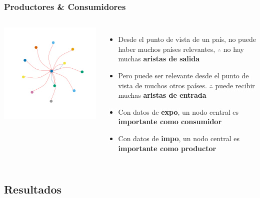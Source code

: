 \documentclass[compress]{beamer}
\begin{document}
\begin{frame}
\frametitle{Productores \& Consumidores}	
\begin{columns}
\includegraphics[width=\linewidth]{toy_graph1}

\begin{itemize}[label=\faRebel]
	\item Desde el punto de vista de un país, no puede haber muchos países relevantes, $\therefore$ no hay muchas \textbf{aristas de salida}
	\item Pero puede ser relevante desde el punto de vista de muchos otros países.
	$\therefore$ puede recibir muchas \textbf{aristas de entrada}
	\item Con datos de \textbf{expo}, un nodo central es \textbf{importante como consumidor}
	\item Con datos de \textbf{impo}, un nodo central es \textbf{importante como productor}
\end{itemize}	
\end{columns}	
\end{frame}

\subsection{Resultados}
\end{document}
